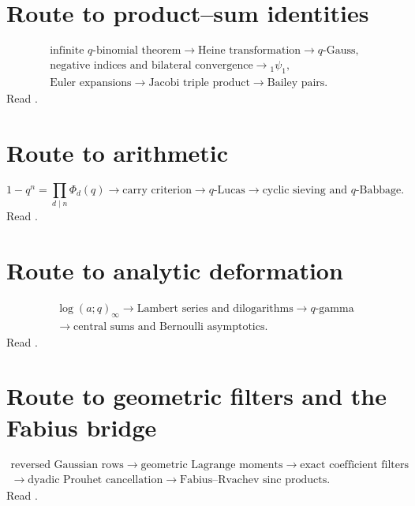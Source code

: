 \documentclass[11pt,oneside,openany]{book}
\theoremstyle{definition}
\theoremstyle{remark}
\begin{document}
\section*{Route to product--sum identities}
\[
\begin{gathered}
 \text{infinite }q\text{-binomial theorem}
 \longrightarrow \text{Heine transformation}
 \longrightarrow q\text{-Gauss},\\
 \text{negative indices and bilateral convergence}
 \longrightarrow {}_1\psi_1,\\
 \text{Euler expansions}
 \longrightarrow \text{Jacobi triple product}
 \longrightarrow \text{Bailey pairs}.
\end{gathered}
\]
Read .

\section*{Route to arithmetic}
\[
 1-q^n=\prod_{d\mid n}\Phi_d(q)
 \longrightarrow \text{carry criterion}
 \longrightarrow q\text{-Lucas}
 \longrightarrow \text{cyclic sieving and }q\text{-Babbage}.
\]
Read .

\section*{Route to analytic deformation}
\[
\begin{gathered}
 \log(a;q)_\infty
 \longrightarrow \text{Lambert series and dilogarithms}
 \longrightarrow q\text{-gamma}\\
 \longrightarrow \text{central sums and Bernoulli asymptotics}.
\end{gathered}
\]
Read .

\section*{Route to geometric filters and the Fabius bridge}
\[
\begin{gathered}
 \text{reversed Gaussian rows}
 \longrightarrow \text{geometric Lagrange moments}
 \longrightarrow \text{exact coefficient filters}\\
 \longrightarrow \text{dyadic Prouhet cancellation}
 \longrightarrow \text{Fabius--Rvachev sinc products}.
\end{gathered}
\]
Read .
\end{document}
